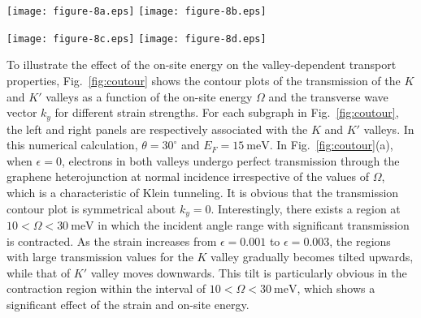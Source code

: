 \documentclass[reprint,amsmath,amssymb,aps,superscriptaddress]{revtex4-2}
\begin{document}
\begin{figure*}[htb]
	\centering
	\texttt{[image: figure-8a.eps]}%
	\texttt{[image: figure-8b.eps]}%
	
	\texttt{[image: figure-8c.eps]}%
	\texttt{[image: figure-8d.eps]}%
\caption{\label{fig:coutour}  Contour plots of the valley-dependent transmission of the graphene heterojunction as a function of the on-site energy $\Omega$ and the wave vector $k_y$ for different strain strengths:
		(a) $\epsilon=0$, (b) $\epsilon=0.001$, (c) $\epsilon=0.002$, (d) $\epsilon=0.003$.
		The other parameters are $\nu=0.165$, $\theta=30^\circ$, and $L_{x}=123\ \mathrm{nm}$. For each panel, the left and right subgraphs are associated with the $K$ and $K'$ valleys, respectively.}
\end{figure*}

To illustrate the effect of the on-site energy on the valley-dependent transport properties,
Fig.~\ref{fig:coutour} shows the contour plots of the transmission of the $K$ and $K'$ valleys as a function of the on-site energy $\Omega$ and the transverse wave vector $k_{y}$ for different strain strengths. For each subgraph in Fig.~\ref{fig:coutour}, the left and right panels are respectively associated with the $K$ and $K'$ valleys. In this numerical calculation, $\theta=30^\circ$ and $E_{F}=15\ \mathrm{meV}$. In Fig.~\ref{fig:coutour}(a), when $\epsilon=0$, electrons in both valleys undergo perfect transmission through the graphene heterojunction at normal incidence irrespective of the values of $\Omega$, which is a characteristic of Klein tunneling. It is obvious that the transmission contour plot is symmetrical about $k_{y}=0$. Interestingly, there exists a region at $10<\Omega<30\ \mathrm{meV}$ in which the incident angle range with significant transmission is contracted. As the strain increases from $\epsilon=0.001$ to $\epsilon=0.003$, the regions with large transmission values for the $K$ valley gradually becomes tilted upwards, while that of $K'$ valley moves downwards. This tilt is particularly obvious in the contraction region within the interval of $10<\Omega<30\ \mathrm{meV}$, which shows a significant effect of the strain and on-site energy.
\end{document}
